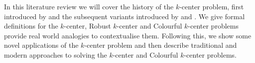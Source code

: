 In this literature review we will cover the history of the $k$-center problem, first introduced by \textcite{hakimi_optimum_1964} and the subsequent variants introduced by \textcite{charikar_algorithms_2001} and \textcite{bandyapadhyay_constant_2019}. We give formal definitions for the $k$-center, Robust $k$-center and Colourful $k$-center problems provide real world analogies to contextualise them. Following this, we show some novel applications of the $k$-center problem and then describe traditional and modern approaches to solving the $k$-center and Colourful $k$-center problems.
